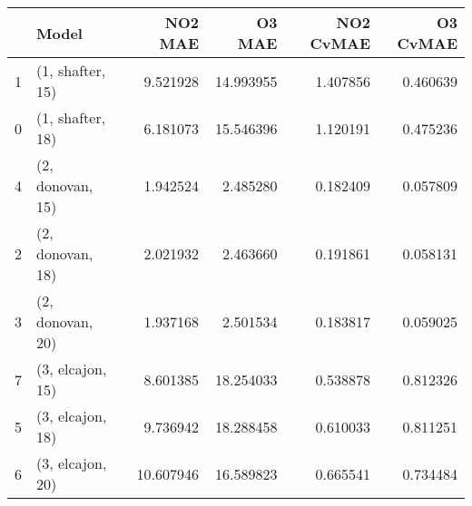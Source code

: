\begin{tabular}{llrrrr}
\toprule
{} &             Model &    NO2 MAE &     O3 MAE &  NO2 CvMAE &  O3 CvMAE \\
\midrule
1 &  (1, shafter, 15) &   9.521928 &  14.993955 &   1.407856 &  0.460639 \\
0 &  (1, shafter, 18) &   6.181073 &  15.546396 &   1.120191 &  0.475236 \\
4 &  (2, donovan, 15) &   1.942524 &   2.485280 &   0.182409 &  0.057809 \\
2 &  (2, donovan, 18) &   2.021932 &   2.463660 &   0.191861 &  0.058131 \\
3 &  (2, donovan, 20) &   1.937168 &   2.501534 &   0.183817 &  0.059025 \\
7 &  (3, elcajon, 15) &   8.601385 &  18.254033 &   0.538878 &  0.812326 \\
5 &  (3, elcajon, 18) &   9.736942 &  18.288458 &   0.610033 &  0.811251 \\
6 &  (3, elcajon, 20) &  10.607946 &  16.589823 &   0.665541 &  0.734484 \\
\bottomrule
\end{tabular}
